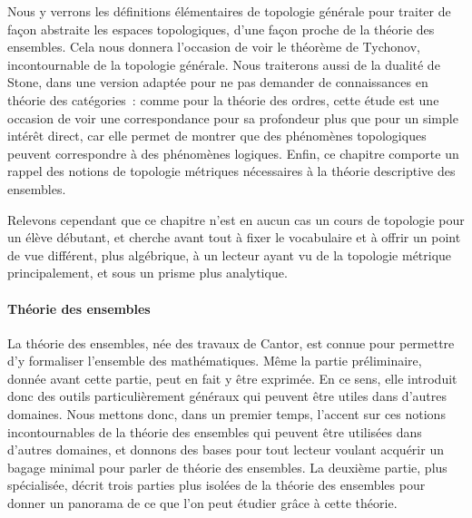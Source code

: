 \begin{itemize}
  Nous y verrons les définitions élémentaires de topologie générale pour traiter
  de façon abstraite les espaces topologiques, d'une façon proche de la théorie
  des ensembles. Cela nous donnera l'occasion de voir le théorème de Tychonov,
  incontournable de la topologie générale. Nous traiterons aussi de la dualité
  de Stone, dans une version adaptée pour ne pas demander de connaissances en
  théorie des catégories~: comme pour la théorie des ordres, cette étude est une
  occasion de voir une correspondance pour sa profondeur plus que pour un simple
  intérêt direct, car elle permet de montrer que des phénomènes topologiques
  peuvent correspondre à des phénomènes logiques. Enfin, ce chapitre comporte un
  rappel des notions de topologie métriques nécessaires à la théorie descriptive
  des ensembles.

  Relevons cependant que ce chapitre n'est en aucun cas un cours de topologie
  pour un élève débutant, et cherche avant tout à fixer le vocabulaire et à
  offrir un point de vue différent, plus algébrique, à un lecteur ayant vu de la
  topologie métrique principalement, et sous un prisme plus analytique.
\end{itemize}

\paragraph{Théorie des ensembles}
La théorie des ensembles, née des travaux de Cantor, est connue pour permettre
d'y formaliser l'ensemble des mathématiques. Même la partie préliminaire, donnée
avant cette partie, peut en fait y être exprimée. En ce sens, elle introduit
donc des outils particulièrement généraux qui peuvent être utiles dans d'autres
domaines. Nous mettons donc, dans un premier temps, l'accent sur ces notions
incontournables de la théorie des ensembles qui peuvent être utilisées dans
d'autres domaines, et donnons des bases pour tout lecteur voulant acquérir un
bagage minimal pour parler de théorie des ensembles. La deuxième partie, plus
spécialisée, décrit trois parties plus isolées de la théorie des ensembles pour
donner un panorama de ce que l'on peut étudier grâce à cette théorie.

